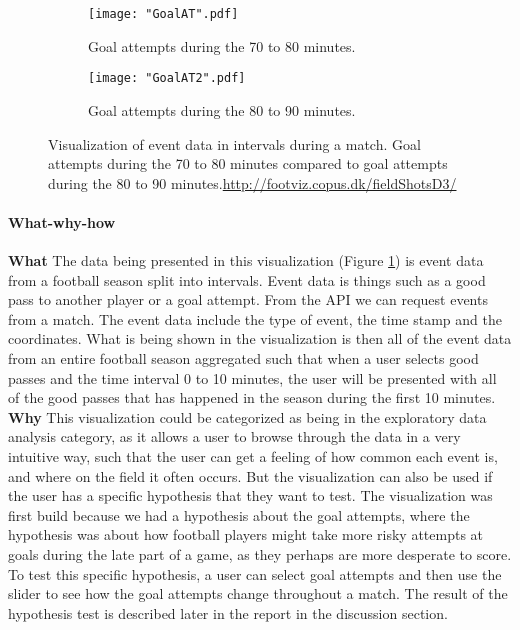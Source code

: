 \documentclass[Report.tex]{subfiles}
\begin{document}
\begin{figure}
\center
\begin{subfigure}[b]{0.7\linewidth}
\texttt{[image: "GoalAT".pdf]}
\caption{Goal attempts during the 70 to 80 minutes.}
\end{subfigure}
\begin{subfigure}[b]{0.7\textwidth}
\texttt{[image: "GoalAT2".pdf]}
\caption{Goal attempts during the 80 to 90 minutes.}
\end{subfigure}
\caption{Visualization of event data in intervals during a match. Goal attempts during the 70 to 80 minutes compared to goal attempts during the 80 to 90 minutes.\url{http://footviz.copus.dk/fieldShotsD3/}}

\label{Fig:Events}
\end{figure}

\paragraph{What-why-how\\}
\textbf{What} The data being presented in this visualization (Figure \ref{Fig:Events}) is event data from a football season split into intervals. Event data is things such as a good pass to another player or a goal attempt. From the API we can request events from a match. The event data include the type of event, the time stamp and the coordinates. What is being shown in the visualization is then all of the event data from an entire football season aggregated such that when a user selects good passes and the time interval 0 to 10 minutes, the user will be presented with all of the good passes that has happened in the season during the first 10 minutes.\\

\noindent \textbf{Why} This visualization could be categorized as being in the exploratory data analysis category, as it allows a user to browse through the data in a very intuitive way, such that the user can get a feeling of how common each event is, and where on the field it often occurs. But the visualization can also be used if the user has a specific hypothesis that they want to test. The visualization was first build because we had a hypothesis about the goal attempts, where the hypothesis was about how football players might take more risky attempts at goals during the late part of a game, as they perhaps are more desperate to score. To test this specific hypothesis, a user can select goal attempts and then use the slider to see how the goal attempts change throughout a match. The result of the hypothesis test is described later in the report in the discussion section.\\
\end{document}
